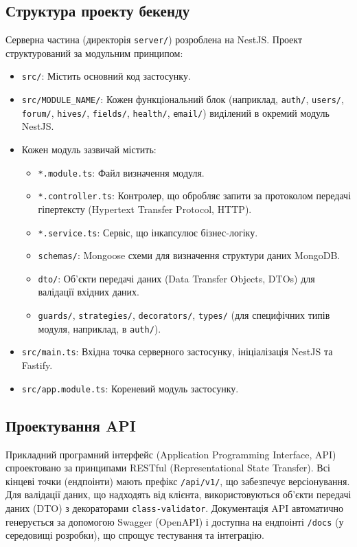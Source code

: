 \subsection{Структура проекту бекенду}
Серверна частина (директорія \texttt{server/}) розроблена на NestJS. Проект структурований за модульним принципом:
\begin{itemize}
    \item \texttt{src/}: Містить основний код застосунку.
    \item \texttt{src/MODULE\_NAME/}: Кожен функціональний блок (наприклад, \texttt{auth/}, \texttt{users/}, \texttt{forum/}, \texttt{hives/}, \texttt{fields/}, \texttt{health/}, \texttt{email/}) виділений в окремий модуль NestJS.
    \item Кожен модуль зазвичай містить:
        \begin{itemize}
            \item \texttt{*.module.ts}: Файл визначення модуля.
            \item \texttt{*.controller.ts}: Контролер, що обробляє запити за протоколом передачі гіпертексту (Hypertext Transfer Protocol, HTTP).
            \item \texttt{*.service.ts}: Сервіс, що інкапсулює бізнес-логіку.
            \item \texttt{schemas/}: Mongoose схеми для визначення структури даних MongoDB.
            \item \texttt{dto/}: Об'єкти передачі даних (Data Transfer Objects, DTOs) для валідації вхідних даних.
            \item \texttt{guards/}, \texttt{strategies/}, \texttt{decorators/}, \texttt{types/} (для специфічних типів модуля, наприклад, в \texttt{auth/}).
        \end{itemize}
    \item \texttt{src/main.ts}: Вхідна точка серверного застосунку, ініціалізація NestJS та Fastify.
    \item \texttt{src/app.module.ts}: Кореневий модуль застосунку.
\end{itemize}

\subsection{Проектування API}
Прикладний програмний інтерфейс (Application Programming Interface, API) спроектовано за принципами RESTful (Representational State Transfer). Всі кінцеві точки (ендпоінти) мають префікс \texttt{/api/v1/}, що забезпечує версіонування. Для валідації даних, що надходять від клієнта, використовуються об'єкти передачі даних (DTO) з декораторами \texttt{class-validator}. Документація API автоматично генерується за допомогою Swagger (OpenAPI) і доступна на ендпоінті \texttt{/docs} (у середовищі розробки), що спрощує тестування та інтеграцію.

